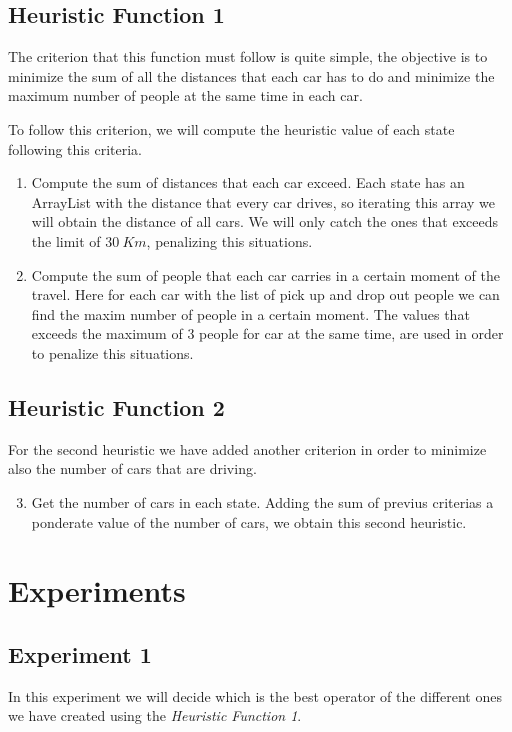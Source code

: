 \documentclass[12]{article}
\begin{document}
\subsection{Heuristic Function 1}

The criterion that this function must follow is quite simple, the objective is to minimize the sum of all the distances that each car has to do and minimize the maximum number of people at the same time in each car.

To follow this criterion, we will compute the heuristic value of each state following this criteria.

\begin{enumerate}
  \item Compute the sum of distances that each car exceed. Each state has an ArrayList with the distance that every car drives, so iterating this array we will obtain the distance of all cars. We will only catch the ones that exceeds the limit of $30\ Km$, penalizing this situations.
  \item Compute the sum of people that each car carries in a certain moment of the travel. Here for each car with the list of pick up and drop out people we can find the maxim number of people in a certain moment. The values that exceeds the maximum of 3 people for car at the same time, are used in order to penalize this situations.
\end{enumerate}

\subsection{Heuristic Function 2}

For the second heuristic we have added another criterion in order to minimize also the number of cars that are driving. 

\begin{enumerate}
  \setcounter{enumi}{2}
  \item Get the number of cars in each state. Adding the sum of previus criterias a ponderate value of the number of cars, we obtain this second heuristic.
\end{enumerate}

\section{Experiments}

\subsection{Experiment 1}
In this experiment we will decide which is the best operator of the different ones we have created using the \textit{Heuristic Function 1}. 
\\
\medskip 
\end{document}
